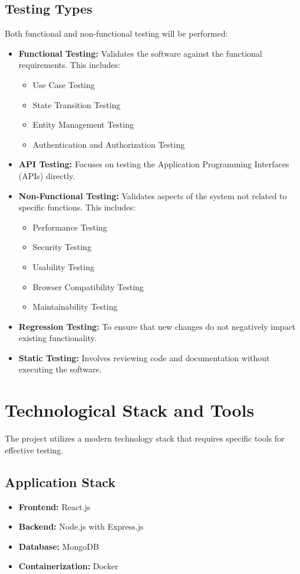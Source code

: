 \documentclass{article}
\begin{document}
\subsection{Testing Types}
Both functional and non-functional testing will be performed:
\begin{itemize}
    \item \textbf{Functional Testing:} Validates the software against the functional requirements. This includes:
    \begin{itemize}
        \item Use Case Testing
        \item State Transition Testing
        \item Entity Management Testing
        \item Authentication and Authorization Testing
    \end{itemize}
    \item \textbf{API Testing:} Focuses on testing the Application Programming Interfaces (APIs) directly.
    \item \textbf{Non-Functional Testing:} Validates aspects of the system not related to specific functions. This includes:
    \begin{itemize}
        \item Performance Testing
        \item Security Testing
        \item Usability Testing
        \item Browser Compatibility Testing
        \item Maintainability Testing
    \end{itemize}
    \item \textbf{Regression Testing:} To ensure that new changes do not negatively impact existing functionality.
    \item \textbf{Static Testing:} Involves reviewing code and documentation without executing the software.
\end{itemize}

\section{Technological Stack and Tools}

The project utilizes a modern technology stack that requires specific tools for effective testing.

\subsection{Application Stack}
\begin{itemize}
    \item \textbf{Frontend:} React.js
    \item \textbf{Backend:} Node.js with Express.js
    \item \textbf{Database:} MongoDB
    \item \textbf{Containerization:} Docker
\end{itemize}
\end{document}
